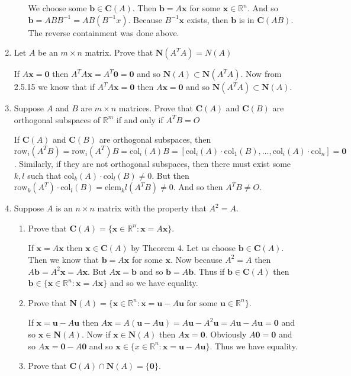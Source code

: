 \documentclass[letterpaper]{article}
\begin{document}
\begin{enumerate}
\begin{enumerate}
  We choose some $\mathbf{b}\in \mathbf{C}(A)$. Then $\mathbf{b}=A\mathbf{x}$ for some $\mathbf{x}\in \mathbb{R}^n$. And so $\mathbf{b}=ABB^{-1}=AB(B^{-1}x)$. Because $B^{-1}\mathbf{x}$ exists, then $\mathbf{b}$ is in $\mathbf{C}(AB)$. The reverse containment was done above.
  \end{enumerate}
\item
Let $A$ be an $m\times n$ matrix. Prove that $\mathbf{N}(A^TA)=N(A)$

If $A\mathbf{x}=\mathbf{0}$ then $A^TA\mathbf{x}=A^T\mathbf{0}=\mathbf{0}$ and so $\mathbf{N}(A)\subset \mathbf{N}(A^TA)$. Now from 2.5.15 we know that if $A^TA\mathbf{x}=\mathbf{0}$ then $A\mathbf{x}=\mathbf{0}$ and so $\mathbf{N}(A^TA)\subset \mathbf{N}(A)$.
\item
Suppose $A$ and $B$ are $m\times n$ matrices. Prove that $\mathbf{C}(A)$ and $\mathbf{C}(B)$ are orthogonal subspaces of $\mathbb{R}^m$ if and only if $A^TB=O$

If $\mathbf{C}(A)$ and $\mathbf{C}(B)$ are orthogonal subspaces, then $\text{row}_i(A^TB)=\text{row}_i(A^T)B=\text{col}_i(A)B=[\text{col}_i(A)\cdot\text{col}_1(B),\dots,\text{col}_i(A)\cdot\text{col}_n]=\mathbf{0}$. Similarly, if they are not orthogonal subspaces, then there must exist some $k,l$ such that $\text{col}_k(A)\cdot\text{col}_l(B)\ne 0$. But then $\text{row}_k(A^T)\cdot\text{col}_l(B)=\text{elem}_kl(A^TB)\ne 0$. And so then $A^TB\ne O$.
\item
Suppose $A$ is an $n\times n$ matrix with the property that $A^2=A$.
  \begin{enumerate}
  \item
  Prove that $\mathbf{C}(A)=\{\mathbf{x}\in \mathbb{R}^n:\mathbf{x}=A\mathbf{x}\}$.

  If $\mathbf{x}=A\mathbf{x}$ then $\mathbf{x}\in \mathbf{C}(A)$ by Theorem 4. Let us choose $\mathbf{b}\in \mathbf{C}(A)$. Then we know that $\mathbf{b}=A\mathbf{x}$ for some $\mathbf{x}$. Now because $A^2=A$ then $A\mathbf{b}=A^2\mathbf{x}=A\mathbf{x}$. But $A\mathbf{x}=\mathbf{b}$ and so $\mathbf{b}=A\mathbf{b}$. Thus if $\mathbf{b}\in \mathbf{C}(A)$ then $\mathbf{b}\in \{\mathbf{x}\in \mathbb{R}^n:\mathbf{x}=A\mathbf{x}\}$ and so we have equality.
  \item
  Prove that $\mathbf{N}(A)=\{\mathbf{x}\in \mathbb{R}^n:\mathbf{x}=\mathbf{u}-A\mathbf{u}\text{ for some }\mathbf{u}\in \mathbb{R}^n\}$.

  If $\mathbf{x}=\mathbf{u}-A\mathbf{u}$ then $A\mathbf{x}=A(\mathbf{u}-A\mathbf{u})=A\mathbf{u}-A^2\mathbf{u}=A\mathbf{u}-A\mathbf{u}=\mathbf{0}$ and so $\mathbf{x}\in \mathbf{N}(A)$. Now if $\mathbf{x}\in \mathbf{N}(A)$ then $A\mathbf{x}=\mathbf{0}$. Obviously $A\mathbf{0}=\mathbf{0}$ and so $A\mathbf{x}=\mathbf{0}-A\mathbf{0}$ and so $\mathbf{x}\in \{x\in \mathbb{R}^n:\mathbf{x}=\mathbf{u}-A\mathbf{u}\}$. Thus we have equality.
  \item
  Prove that $\mathbf{C}(A)\cap\mathbf{N}(A)=\{\mathbf{0}\}$.


\end{enumerate}
\end{enumerate}
\end{document}
